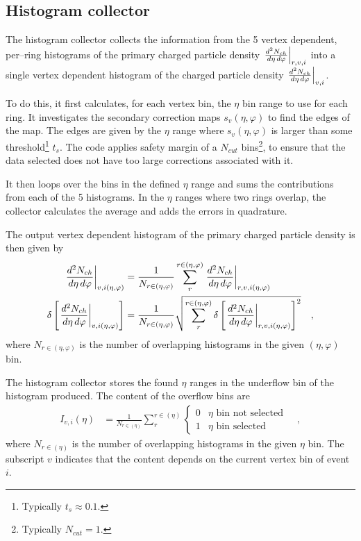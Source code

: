 \documentclass[11pt]{article}
\newcommand{\dndetadphi}[1][]{{\ensuremath%
    \ifx|#1|\else\left.\fi%
    \frac{d^2N_{ch}}{d\eta\,d\varphi}%
    \ifx|#1|\else\right|_{#1}\fi%
}}
\begin{document}
\subsection{Histogram collector}

The histogram collector collects the information from the 5 vertex
dependent, per--ring histograms of the primary charged particle
density $\dndetadphi[r,v,i]$ into a single vertex dependent histogram
of the charged particle density $\dndetadphi[v,i]$.  

To do this, it first calculates, for each vertex bin, the $\eta$ bin
range to use for each ring.  It investigates the secondary correction
maps $s_v(\eta,\varphi)$ to find the edges of the map.  The edges are
given by the $\eta$ range where $s_v(\eta,\varphi)$ is larger than
some threshold\footnote{Typically $t_s\approx 0.1$.}  $t_s$. The code
applies safety margin of a $N_{cut}$ bins\footnote{Typically
  $N_{cut}=1$.}, to ensure that the data selected does not have too
large corrections associated with it.

It then loops over the bins in the defined $\eta$ range and sums the
contributions from each of the 5 histograms.  In the $\eta$ ranges
where two rings overlap, the collector calculates the average and adds
the errors in quadrature.

The output vertex dependent histogram of the primary
charged particle density is then given by
\begin{align}
  \label{eq:superhist}
  \dndetadphi[v,i(\eta,\varphi)] &=
  \frac{1}{N_{r\in(\eta,\varphi)}}\sum_{r}^{r\in(\eta,\varphi)}  
  \dndetadphi[r,v,i(\eta,\varphi)]\\
  \delta\left[\dndetadphi[v,i(\eta,\varphi)]\right] &=
  \frac{1}{N_{r\in(\eta,\varphi)}}\sqrt{\sum_{r}^{r\in(\eta,\varphi)}   
    \delta\left[\dndetadphi[r,v,i(\eta,\varphi)]\right]^2}
  \quad,
\end{align}
where $N_{r\in(\eta,\varphi)}$ is the number of overlapping histograms
in the given $(\eta,\varphi)$ bin. 

The histogram collector stores the found $\eta$ ranges in the
underflow bin of the histogram produced.  The content of the overflow
bins are 
\begin{align}
  \label{eq:overflow}
  I_{v,i}(\eta) &= 
  \frac{1}{N_{r\in(\eta)}}
  \sum_{r}^{r\in(\eta)} \left\{\begin{array}{cl} 
      0 & \eta \text{\ bin not selected}\\ 
      1 & \eta \text{\ bin selected}
      \end{array}\right.\quad,
\end{align}
where $N_{r\in(\eta)}$ is the number of overlapping histograms in the
given $\eta$ bin.  The subscript $v$ indicates that the content
depends on the current vertex bin of event $i$.
\end{document}
